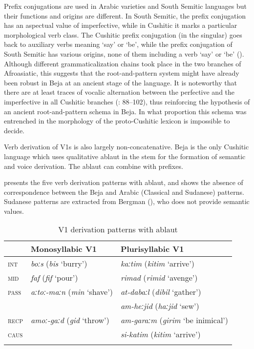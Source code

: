 \documentclass[output=paper]{langsci/langscibook}
\begin{document}
Prefix conjugations are used in Arabic varieties and South Semitic languages but their functions and origins are different. In South Semitic, the prefix conjugation has an aspectual value of imperfective, while in Cushitic it marks a particular morphological verb class. The Cushitic prefix conjugation (in the singular) goes back to auxiliary verbs meaning ‘say’ or ‘be’, while the prefix conjugation of South Semitic has various origins, none of them including a verb ‘say’ or ‘be’ (\citealt{Cohen1984}). Although different grammaticalization chains took place in the two branches of Afroasiatic, this suggests that the root-and-pattern system might have already been robust in Beja at an ancient stage of the language. It is noteworthy that there are at least traces of vocalic alternation between the perfective and the imperfective in all Cushitic branches (\citealt{Cohen1984}: 88--102), thus reinforcing the hypothesis of an ancient root-and-pattern schema in Beja. In what proportion this schema was entrenched in the morphology of the proto-Cushitic lexicon is impossible to decide.

Verb derivation of V1s is also largely non-concatenative. Beja is the only Cushitic language which uses qualitative ablaut in the stem for the formation of seman\-tic and voice derivation. The ablaut can combine with prefixes. 

 presents the five verb derivation patterns with ablaut, and  shows the absence of correspondence between the Beja and Arabic (Classical and Sudanese) patterns. Sudanese patterns are extracted from Bergman (\citeyear[32--34]{Bergman2002}), who does not provide semantic values.

\begin{table}
\begin{tabular}{lll}\lsptoprule 
& Monosyllabic V1 &  Plurisyllabic V1\\\midrule
\textsc{int} & \textit{boːs} (\textit{bis} ‘burry’) & \textit{kaːtim} (\textit{kitim} ‘arrive’)\\
\textsc{mid} & \textit{faf} (\textit{fif} ‘pour’) & \textit{rimad} (\textit{rimid} ‘avenge’)\\
\textsc{pass} & \textit{aːtoː-maːn} (\textit{min} ‘shave’) & \textit{at-dabaːl} (\textit{dibil} ‘gather’)\\
&  & \textit{am-heːjid} (\textit{haːjid} ‘sew’)\\
\textsc{recp} & \textit{amoː-gaːd} (\textit{gid} ‘throw’) & \textit{am-garaːm} (\textit{girim} ‘be inimical’)\\
\textsc{caus} &  & \textit{si-katim} (\textit{kitim} ‘arrive’)\\
\lspbottomrule
\end{tabular} 
\caption{V1 derivation patterns with ablaut}
\label{tab:V1}
\end{table}
\end{document}
